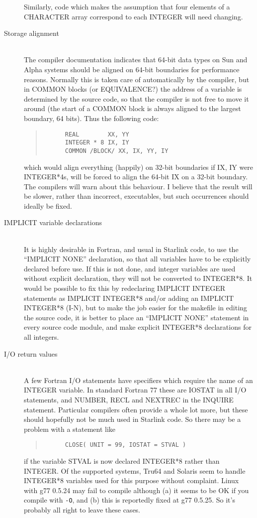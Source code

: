 \documentclass[twoside,11pt]{article}
\newcommand{\html}[1]{}
\renewcommand{\_}{\texttt{\symbol{95}}}
\newcommand{\ditem}[1]{\item[#1]\mbox{}\\}
\newenvironment{squote}{\begin{quote}\begin{small}}{\end{small}\end{quote}}
\begin{document}
\begin{description}
Similarly, code which makes the assumption that four elements of
a CHARACTER array correspond to each INTEGER will need changing.
%
\ditem{Storage alignment}
The compiler documentation indicates that
64-bit data types on Sun and Alpha systems should be aligned on 
64-bit boundaries for performance reasons.
Normally this is taken care of automatically by the compiler, 
but in COMMON blocks (or EQUIVALENCE?) the address of a 
variable is determined by the source code, so that the compiler
is not free to move it around (the start of a COMMON block is
always aligned to the largest boundary, 64 bits).
Thus the following code:
\begin{squote}
\begin{verbatim}
      REAL        XX, YY
      INTEGER * 8 IX, IY
      COMMON /BLOCK/ XX, IX, YY, IY
\end{verbatim}
\end{squote}
which would align everything (happily) on 32-bit boundaries if IX, IY
were INTEGER*4s, will be forced to align the 64-bit IX on a 32-bit
boundary.
The compilers will warn about this behaviour.
I believe that the result will be slower, rather than incorrect,
executables,
but such occurrences should ideally be fixed.
\html{\begin{squote}\end{squote}}
%
\ditem{IMPLICIT variable declarations}
It is highly desirable in Fortran, and usual in Starlink code, to use
the ``IMPLICIT NONE'' declaration, so that all variables have to be
explicitly declared before use.
If this is not done, and integer variables are used without explicit
declaration, they will not be converted to INTEGER*8.
It would be possible to fix this by redeclaring IMPLICIT INTEGER
statements as IMPLICIT INTEGER*8 and/or adding an IMPLICIT INTEGER*8 (I-N), 
but to make the job easier for
the makefile in editing the source code, it is better to place
an ``IMPLICIT NONE'' statement in every source code module, and
make explicit INTEGER*8 declarations for all integers.
\html{\begin{squote}\end{squote}}
%
\ditem{I/O return values}
A few Fortran I/O statements have specifiers which require the name
of an INTEGER variable.  In standard Fortran 77 these are 
IOSTAT in all I/O statements, and 
NUMBER, RECL and NEXTREC in the INQUIRE statement.
Particular compilers often provide a whole lot more, but these
should hopefully not be much used in Starlink code.
So there may be a problem with a statement like
\begin{squote}
\begin{verbatim}
      CLOSE( UNIT = 99, IOSTAT = STVAL )
\end{verbatim}
\end{squote}
if the variable STVAL is now declared INTEGER*8 rather than INTEGER.
Of the supported systems, Tru64 and Solaris seem to handle 
INTEGER*8 variables used for this purpose without complaint.
Linux with g77 0.5.24 may fail to compile although (a) it seems to
be OK if you compile with {\tt -O}, and (b) this is reportedly
fixed at g77 0.5.25.  So it's probably all right to leave these cases.
%
\end{description}
\end{document}
